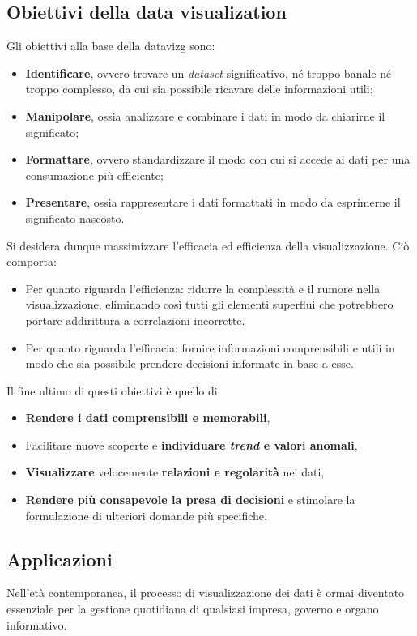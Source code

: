 \subsection{Obiettivi della data visualization}
Gli obiettivi alla base della \gls{datavizg} sono:
\begin{itemize}
    \item \textbf{Identificare}, ovvero trovare un \emph{dataset} significativo, né troppo banale né troppo complesso, da cui sia possibile
    ricavare delle informazioni utili;
    \item \textbf{Manipolare}, ossia analizzare e combinare i dati in modo da chiarirne il significato;
    \item \textbf{Formattare}, ovvero standardizzare il modo con cui si accede ai dati per una consumazione più efficiente;
    \item \textbf{Presentare}, ossia rappresentare i dati formattati in modo da esprimerne il significato nascosto.
\end{itemize}
\noindent Si desidera dunque massimizzare l'efficacia ed efficienza della visualizzazione. Ciò comporta:
\begin{itemize}
    \item Per quanto riguarda l'efficienza: ridurre la complessità e il rumore nella visualizzazione, eliminando così tutti gli elementi superflui che potrebbero
    portare addirittura a correlazioni incorrette.
    \item Per quanto riguarda l'efficacia: fornire informazioni comprensibili e utili in modo che sia possibile prendere decisioni informate in base a esse.
\end{itemize}

\bigskip
\noindent Il fine ultimo di questi obiettivi è quello di:
\begin{itemize}
    \item \textbf{Rendere i dati comprensibili e memorabili},
    \item Facilitare nuove scoperte e \textbf{individuare \emph{trend} e valori anomali},
    \item \textbf{Visualizzare} velocemente \textbf{relazioni e regolarità} nei dati,
    \item \textbf{Rendere più consapevole la presa di decisioni} e stimolare la formulazione di ulteriori domande più specifiche.
\end{itemize} 


\subsection{Applicazioni}
Nell'età contemporanea, il processo di visualizzazione dei dati è ormai diventato essenziale per la gestione quotidiana di qualsiasi 
impresa, governo e organo informativo.

